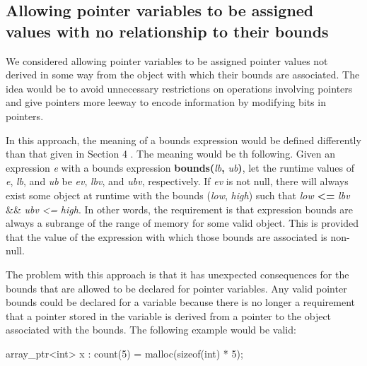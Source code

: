 \documentclass[]{article}
\begin{document}
\subsection{\texorpdfstring{\protect\hypertarget{ux5fToc437460850}{}{\protect\hypertarget{ux5fToc440445531}{}{\protect\hypertarget{ux5fToc440449313}{}{\protect\hypertarget{ux5fToc440551963}{}{\protect\hypertarget{ux5fRef421875363}{}{\protect\hypertarget{ux5fToc422907009}{}{\protect\hypertarget{ux5fToc424307738}{}{\protect\hypertarget{ux5fToc426641141}{}{\protect\hypertarget{ux5fToc435435016}{}{}}}}}}}}}Allowing
pointer variables to be assigned values with no relationship to their
bounds}{Allowing pointer variables to be assigned values with no relationship to their bounds}}\label{allowing-pointer-variables-to-be-assigned-values-with-no-relationship-to-their-bounds}

We considered allowing pointer variables to be assigned pointer values
not derived in some way from the object with which their bounds are
associated. The idea would be to avoid unnecessary restrictions on
operations involving pointers and give pointers more leeway to encode
information by modifying bits in pointers.

In this approach, the meaning of a bounds expression would be defined
differently than that given in Section 4 . The meaning would be th
following. Given an expression \emph{e} with a bounds expression
\textbf{bounds(}\emph{lb}\textbf{,} \emph{ub}\textbf{)}, let the runtime
values of \emph{e}, \emph{lb}, and \emph{ub} be \emph{ev}, \emph{lbv},
and \emph{ubv}, respectively. If \emph{ev} is not null, there will
always exist some object at runtime with the bounds (\emph{low},
\emph{high}) such that \emph{low} \textbf{\textless{}=} \emph{lbv} \&\&
\emph{ubv} \emph{\textless{}=} \emph{high}. In other words, the
requirement is that expression bounds are always a subrange of the range
of memory for some valid object. This is provided that the value of the
expression with which those bounds are associated is non-null.

The problem with this approach is that it has unexpected consequences
for the bounds that are allowed to be declared for pointer variables.
Any valid pointer bounds could be declared for a variable because there
is no longer a requirement that a pointer stored in the variable is
derived from a pointer to the object associated with the bounds. The
following example would be valid:

array\_ptr\textless{}int\textgreater{} x : count(5) = malloc(sizeof(int)
* 5);
\end{document}
